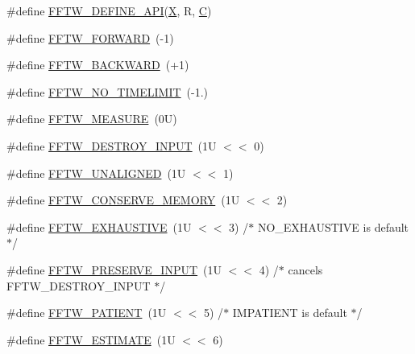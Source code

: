 \begin{DoxyCompactItemize}
\#define \hyperlink{fftw-3_82_82-dll64_2fftw3_8h_a26ae820d7471113c2a4e7f29d11aedd4}{F\-F\-T\-W\-\_\-\-D\-E\-F\-I\-N\-E\-\_\-\-A\-P\-I}(\hyperlink{xyz2cfg_8m_ac51b57a703ba1c5869228690c93e1701}{X}, R, \hyperlink{fileio__fftw3_8cpp_ac4cf4b2ab929bd23951a8676eeac086b}{C})
\item 
\#define \hyperlink{fftw-3_82_82-dll64_2fftw3_8h_a38b39098878bfef014d845651e16755d}{F\-F\-T\-W\-\_\-\-F\-O\-R\-W\-A\-R\-D}~(-\/1)
\item 
\#define \hyperlink{fftw-3_82_82-dll64_2fftw3_8h_ab522872280f9319794c56fabc290e80c}{F\-F\-T\-W\-\_\-\-B\-A\-C\-K\-W\-A\-R\-D}~(+1)
\item 
\#define \hyperlink{fftw-3_82_82-dll64_2fftw3_8h_adc11959487f3594e24d68a408bea4951}{F\-F\-T\-W\-\_\-\-N\-O\-\_\-\-T\-I\-M\-E\-L\-I\-M\-I\-T}~(-\/1.)
\item 
\#define \hyperlink{fftw-3_82_82-dll64_2fftw3_8h_a74838abba9d888010289fc8039b188bd}{F\-F\-T\-W\-\_\-\-M\-E\-A\-S\-U\-R\-E}~(0\-U)
\item 
\#define \hyperlink{fftw-3_82_82-dll64_2fftw3_8h_ad282110582a109aa54215bb849fdcd3a}{F\-F\-T\-W\-\_\-\-D\-E\-S\-T\-R\-O\-Y\-\_\-\-I\-N\-P\-U\-T}~(1\-U $<$$<$ 0)
\item 
\#define \hyperlink{fftw-3_82_82-dll64_2fftw3_8h_a5cd69e615f971ec1076e0cbdc961bae9}{F\-F\-T\-W\-\_\-\-U\-N\-A\-L\-I\-G\-N\-E\-D}~(1\-U $<$$<$ 1)
\item 
\#define \hyperlink{fftw-3_82_82-dll64_2fftw3_8h_adf2fa59f458a62833ff5079112e8cf9a}{F\-F\-T\-W\-\_\-\-C\-O\-N\-S\-E\-R\-V\-E\-\_\-\-M\-E\-M\-O\-R\-Y}~(1\-U $<$$<$ 2)
\item 
\#define \hyperlink{fftw-3_82_82-dll64_2fftw3_8h_a7dc5dd441d6945eaddf302a320ed0656}{F\-F\-T\-W\-\_\-\-E\-X\-H\-A\-U\-S\-T\-I\-V\-E}~(1\-U $<$$<$ 3) /$\ast$ N\-O\-\_\-\-E\-X\-H\-A\-U\-S\-T\-I\-V\-E is default $\ast$/
\item 
\#define \hyperlink{fftw-3_82_82-dll64_2fftw3_8h_abb7108827f62bbe6e662b8f948637d62}{F\-F\-T\-W\-\_\-\-P\-R\-E\-S\-E\-R\-V\-E\-\_\-\-I\-N\-P\-U\-T}~(1\-U $<$$<$ 4) /$\ast$ cancels F\-F\-T\-W\-\_\-\-D\-E\-S\-T\-R\-O\-Y\-\_\-\-I\-N\-P\-U\-T $\ast$/
\item 
\#define \hyperlink{fftw-3_82_82-dll64_2fftw3_8h_a98f8ab33cff17c40865428f652b7ea8e}{F\-F\-T\-W\-\_\-\-P\-A\-T\-I\-E\-N\-T}~(1\-U $<$$<$ 5) /$\ast$ I\-M\-P\-A\-T\-I\-E\-N\-T is default $\ast$/
\item 
\#define \hyperlink{fftw-3_82_82-dll64_2fftw3_8h_afb7257abc054cd5874b3c011437cc801}{F\-F\-T\-W\-\_\-\-E\-S\-T\-I\-M\-A\-T\-E}~(1\-U $<$$<$ 6)
\item 
$$
\end{DoxyCompactItemize}
